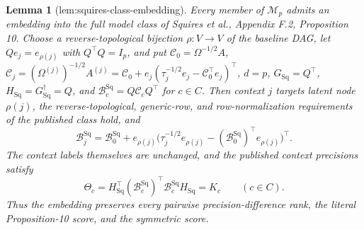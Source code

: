 \documentclass{article}
\newtheorem{lemma}{Lemma}
\begin{document}
\begin{lemma}[lem:squires-class-embedding]\label{lem:squires-class-embedding}
Every member of \(\mathcal M_p\) admits an embedding into the full model class of Squires et al., Appendix F.2, Proposition 10. Choose a reverse-topological bijection \(\rho:V\to V\) of the baseline DAG, let \(Qe_j=e_{\rho(j)}\) with \(Q^{\top}Q=I_p\), and put \(\mathcal C_0=\Omega^{-1/2}A\), \(\mathcal C_j=(\Omega^{(j)})^{-1/2}A^{(j)}=\mathcal C_0+e_j(\tau_j^{-1/2}e_j-\mathcal C_0^{\top}e_j)^{\top}\), \(d=p\), \(G_{\mathrm{Sq}}=Q^{\top}\), \(H_{\mathrm{Sq}}=G_{\mathrm{Sq}}^{\dagger}=Q\), and \(\mathcal B_c^{\mathrm{Sq}}=Q\mathcal C_cQ^{\top}\) for \(c\in C\). Then context \(j\) targets latent node \(\rho(j)\), the reverse-topological, generic-row, and row-normalization requirements of the published class hold, and \[ \mathcal B_j^{\mathrm{Sq}}=\mathcal B_0^{\mathrm{Sq}}+e_{\rho(j)}\bigl(\tau_j^{-1/2}e_{\rho(j)}-(\mathcal B_0^{\mathrm{Sq}})^{\top}e_{\rho(j)}\bigr)^{\top}. \] The context labels themselves are unchanged, and the published context precisions satisfy \[ \Theta_c=H_{\mathrm{Sq}}^{\top}(\mathcal B_c^{\mathrm{Sq}})^{\top}\mathcal B_c^{\mathrm{Sq}}H_{\mathrm{Sq}}=K_c \qquad(c\in C). \] Thus the embedding preserves every pairwise precision-difference rank, the literal Proposition-10 score, and the symmetric score.
\end{lemma}
\end{document}

